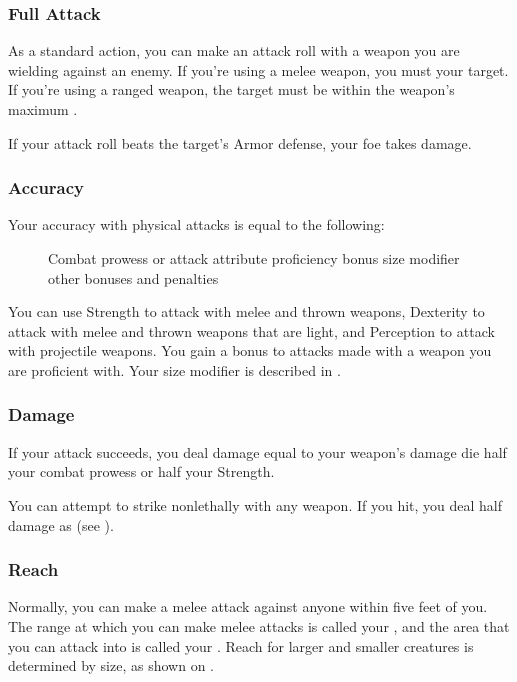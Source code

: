 \subsubsection{Full Attack}\label{Full Attack}
As a standard action, you can make an attack roll with a weapon you are wielding against an enemy.
If you're using a melee weapon, you must  your target.
If you're using a ranged weapon, the target must be within the weapon's maximum .

If your attack roll beats the target's Armor defense, your foe takes damage.

\subsubsection{Accuracy}
Your accuracy with physical attacks is equal to the following:

\begin{figure}[h]
    \centering Combat prowess or attack attribute \add proficiency bonus \add size modifier \add other bonuses and penalties
\end{figure}

 You can use Strength to attack with melee and thrown weapons, Dexterity to attack with melee and thrown weapons that are light, and Perception to attack with projectile weapons.
 You gain a  bonus to attacks made with a weapon you are proficient with.
 Your size modifier is described in .

\subsubsection{Damage}
If your attack succeeds, you deal damage equal to your weapon's damage die \add half your combat prowess or half your Strength.

 You can attempt to strike nonlethally with any weapon.
If you hit, you deal half damage as  (see ).

\subsubsection{Reach}\label{Reach}
Normally, you can make a melee attack against anyone within five feet of you.
The range at which you can make melee attacks is called your , and the area that you can attack into is called your .
Reach for larger and smaller creatures is determined by size, as shown on .


